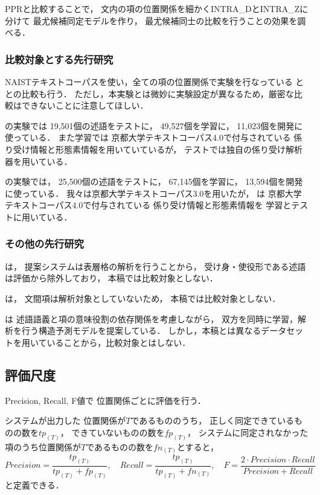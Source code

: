 \documentclass[japanese]{jnlp_1.4}
\begin{document}
PPRと比較することで，
文内の項の位置関係を細かくINTRA\_DとINTRA\_Zに分けて
最尤候補同定モデルを作り，
最尤候補同士の比較を行うことの効果を調べる．


\subsubsection{比較対象とする先行研究}

NAISTテキストコーパスを使い，全ての項の位置関係で実験を行なっている
\cite{Taira:2008:EMNLP}と\cite{Imamura:2009:ACL}
との比較も行う．
ただし，本実験とは微妙に実験設定が異なるため，厳密な比較はできないことに注意してほしい．

の実験では
 19,501個の述語をテストに，
  49,527個を学習に，
  11,023個を開発に使っている．
また学習では
京都大学テキストコーパス4.0で付与されている
係り受け情報と形態素情報を用いていているが，
テストでは独自の係り受け解析器を用いている．

の実験では，
 25,500個の述語をテストに，
  67,145個を学習に，
  13,594個を開発に使っている．
我々は京都大学テキストコーパス3.0を用いたが，
は
京都大学テキストコーパス4.0で付与されている
係り受け情報と形態素情報を
学習とテストに用いている．


\subsubsection{その他の先行研究}

は，
提案システムは表層格の解析を行うことから，
受け身・使役形である述語は評価から除外しており，
本稿では比較対象としない．

は，
文間項は解析対象としていないため，
本稿では比較対象としない．

\cite{Watanabe:JSAI:2010}は
述語語義と項の意味役割の依存関係を考慮しながら，
双方を同時に学習，解析を行う構造予測モデルを提案している．
しかし，本稿とは異なるデータセットを用いていることから，比較対象とはしない．

\subsection{評価尺度}

Precision, Recall, F値で
位置関係ごとに評価を行う．

システムが出力した
位置関係が$T$であるもののうち，
正しく同定できているものの数を$tp_{(T)}$，
できていないものの数を$fp_{(T)}$，
システムに同定されなかった項のうち位置関係が$T$であるものの数を$fn_{(T)}$とすると，
\[
Precision = \frac{ tp_{(T)} }{ tp_{(T)} + fp_{(T)} }, \quad
Recall = \frac{ tp_{(T)} }{ tp_{(T)} + fn_{(T)} }, \quad
F = \frac{2 \cdot Precision \cdot Recall}{Precision + Recall}
\label{as}
\]
と定義できる．
\end{document}
